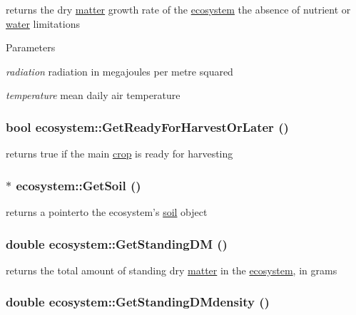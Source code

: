returns the dry \hyperlink{classmatter}{matter} growth rate of the \hyperlink{classecosystem}{ecosystem} the absence of nutrient or \hyperlink{classwater}{water} limitations 
\begin{DoxyParams}{Parameters}
\item[{\em radiation}]radiation in megajoules per metre squared \item[{\em temperature}]mean daily air temperature \end{DoxyParams}
\hypertarget{classecosystem_aa4ce724310a879de8e2d242f5cfe4308}{
\subsubsection[{GetReadyForHarvestOrLater}]{\setlength{\rightskip}{0pt plus 5cm}bool ecosystem::GetReadyForHarvestOrLater ()}}
\label{classecosystem_aa4ce724310a879de8e2d242f5cfe4308}


returns true if the main \hyperlink{classcrop}{crop} is ready for harvesting \hypertarget{classecosystem_a53ac5ef44ba55f24a4210492d909f0d9}{
\subsubsection[{GetSoil}]{$\ast$ ecosystem::GetSoil ()}}
\label{classecosystem_a53ac5ef44ba55f24a4210492d909f0d9}


returns a pointerto the ecosystem's \hyperlink{classsoil}{soil} object \hypertarget{classecosystem_a19d2a4505dee6b26659406de948dc0af}{
\subsubsection[{GetStandingDM}]{\setlength{\rightskip}{0pt plus 5cm}double ecosystem::GetStandingDM ()}}
\label{classecosystem_a19d2a4505dee6b26659406de948dc0af}


returns the total amount of standing dry \hyperlink{classmatter}{matter} in the \hyperlink{classecosystem}{ecosystem}, in grams \hypertarget{classecosystem_a34f12fd834cd50eef38b2c0bfae4b0fa}{
\subsubsection[{GetStandingDMdensity}]{\setlength{\rightskip}{0pt plus 5cm}double ecosystem::GetStandingDMdensity ()}}
\label{classecosystem_a34f12fd834cd50eef38b2c0bfae4b0fa}


